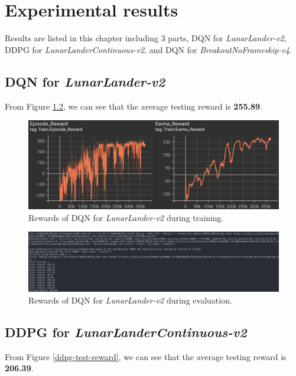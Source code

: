 \chapter{Experimental results}
\indent
	Results are listed in this chapter including 3 parts,
	DQN for \textit{LunarLander-v2}, DDPG for \textit{LunarLanderContinuous-v2}, and DQN for \textit{BreakoutNoFrameskip-v4}.

\section{DQN for \textit{LunarLander-v2}}
\indent
	From Figure \ref{dqn-test-reward}, we can see that the average testing reward is \textbf{255.89}.

	\begin{figure}[H]
		\centering
		\includegraphics[scale=0.6]{img/dqn_train_reward.png}
		\caption{Rewards of DQN for \textit{LunarLander-v2} during training.}
		\label{dqn-train-reward}
	\end{figure}
	\begin{figure}[H]
		\centering
		\includegraphics[width=\textwidth]{img/dqn_test_reward.png}
		\caption{Rewards of DQN for \textit{LunarLander-v2} during evaluation.}
		\label{dqn-test-reward}
	\end{figure}

\section{DDPG for \textit{LunarLanderContinuous-v2}}
\indent
	From Figure \ref{ddpg-test-reward}, we can see that the average testing reward is \textbf{206.39}.

